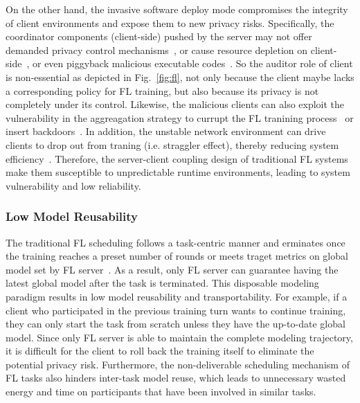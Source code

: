 On the other hand, the invasive software deploy mode compromises the integrity of client environments and expose them to new privacy risks.
Specifically, the coordinator components (client-side) pushed by the server may not offer demanded privacy control mechanisms~\cite{zeng2021fedlab, caldas2018leaf, mcmahan2017communication}, or cause resource depletion on client-side~\cite{bonawitz2019towards, niu2020billion, chen2020deep}, or even piggyback malicious executable codes~\cite{li2017understanding}.
So the auditor role of client is non-essential as depicted in Fig.~\ref{fig:fl}, not only because the client maybe lacks a corresponding policy for FL training, but also because its privacy is not completely under its control.
Likewise, the malicious clients can also exploit the vulnerability in the aggreagation strategy to currupt the FL tranining process~\cite{bouacida2021vulnerabilities, sattler2020byzantine, park2021sageflow, fang2020local} or insert backdoors~\cite{bagdasaryan2020backdoor, wang2020attack}.
In addition, the unstable network environment can drive clients to drop out from traning (i.e. straggler effect), thereby reducing system efficiency~\cite{reisizadeh2019robust, park2021sageflow}.
Therefore, the server-client coupling design of traditional FL systems make them susceptible to unpredictable runtime environments, leading to system vulnerability and low reliability.

\subsubsection{Low Model Reusability} %
The traditional FL scheduling follows a task-centric manner and erminates once the training reaches a preset number of rounds or meets traget metrics on global model set by FL server~\cite{bonawitz2019towards}.
As a result, only FL server can guarantee having the latest global model after the task is terminated.
This disposable modeling paradigm results in low model reusability and transportability.
For example, if a client who participated in the previous training turn wants to continue training, they can only start the task from scratch unless they have the up-to-date global model.
Since only FL server is able to maintain the complete modeling trajectory, it is difficult for the client to roll back the training itself to eliminate the potential privacy risk.
Furthermore, the non-deliverable scheduling mechanism of FL tasks also hinders inter-task model reuse, which leads to unnecessary wasted energy and time on participants that have been involved in similar tasks.


